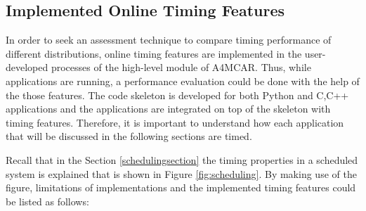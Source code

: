 \subsection{Implemented Online Timing Features} \label{onlinetiming}
In order to seek an assessment technique to compare timing performance of different distributions, online timing features are implemented in the user-developed processes of the high-level module of A4MCAR. Thus, while applications are running, a performance evaluation could be done with the help of the those features. The code skeleton is developed for both Python and C,C++ applications and the applications are integrated on top of the skeleton with timing features. Therefore, it is important to understand how each application that will be discussed in the following sections are timed.

Recall that in the Section \ref{schedulingsection} the timing properties in a scheduled system is explained that is shown in Figure \ref{fig:scheduling}. By making use of the figure, limitations of implementations and the implemented timing features could be listed as follows:
